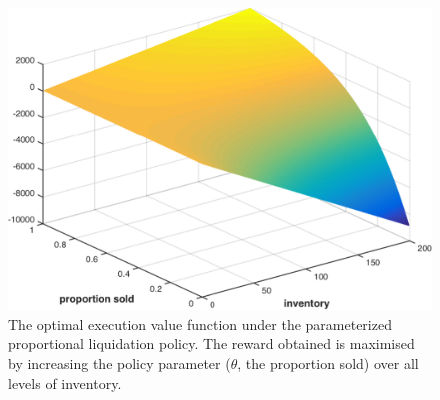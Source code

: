 \begin{figure}[h!]
    \centering
    \includegraphics[width=0.8\linewidth, height=0.55\linewidth]{images/opt_execution_fraction}
    \caption{The optimal execution value function under the parameterized proportional liquidation policy. The reward obtained is maximised by increasing the policy parameter ({\footnotesize $\theta $}, the proportion sold) over all levels of inventory.}
    \label{fig:opt_execution}            
\end{figure}

%    
